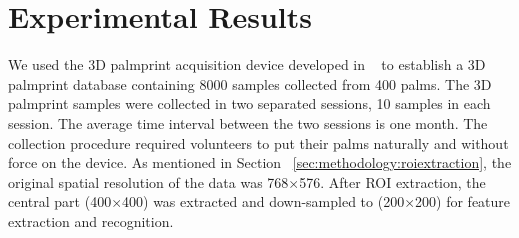 \chapter{Experimental Results\label{ch:experiment}}

We used the 3D palmprint acquisition device developed in ~\cite{Zhang:2009dp} to establish a 3D palmprint database containing 8000 samples collected from 400 palms. The 3D palmprint samples were collected in two separated sessions, 10 samples in each session. The average time interval between the two sessions is one month. The collection procedure required volunteers to put their palms naturally and without force on the device. As mentioned in Section ~\ref{sec:methodology:roiextraction}, the original spatial resolution of the data was 768$\times$576. After ROI extraction, the central part (400$\times$400) was extracted and down-sampled to (200$\times$200) for feature extraction and recognition.




